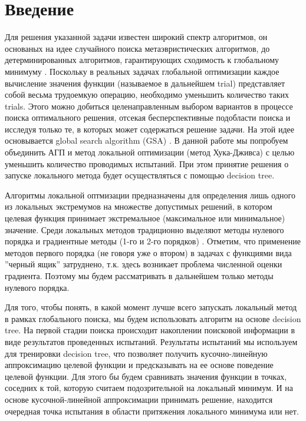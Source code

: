 \documentclass{svproc}
\begin{document}
\section{Введение}

Для решения указанной задачи известен широкий спектр алгоритмов, он основаных на идее случайного поиска \cite{fio_bib1, fio_bib2, fio_bib3} метаэвристических алгоритмов, до детерминированных алгоритмов, гарантирующих сходимость к глобальному минимуму \cite{fio_bib4, fio_bib5, fio_bib6}. 
Поскольку в реальных задачах глобальной оптимизации каждое вычисление значения функции (называемое в дальнейшем trial) представляет собой весьма трудоемкую операцию, необходимо уменьшить количество таких trials. Этого можно добиться целенаправленным выбором вариантов в процессе поиска оптимального решения, отсекая бесперспективные подобласти поиска и исследуя только те, в которых может содержаться решение задачи. На этой идее основывается global search algorithm (GSA) \cite{fio_bib7}. В данной работе мы попробуем объединить АГП и метод локальной оптимизации (метод Хука-Дживса) с целью уменьшить количество проводимых испытаний. При этом принятие решения о запуске локального метода будет осуществляться с помощью decision tree.

Алгоритмы локальной оптмизации предназначены для определения лишь одного из локальных экстремумов на множестве допустимых решений, в котором целевая функция принимает экстремальное (максимальное или минимальное) значение. 
Среди локальных методов традиционно выделяют методы нулевого порядка и градиентные методы  (1-го и 2-го порядков) \cite{fio_bib8,fio_bib9}.
Отметим, что применение методов первого порядка (не говоря уже о втором) в задачах с функциями вида ''черный ящик'' затруднено, т.к. здесь возникает проблема численной оценки градиента. Поэтому мы будем рассматривать в дальнейшем только методы нулевого порядка.

Для того, чтобы понять, в какой момент лучше всего запускать локальный метод в рамках глобального поиска, мы будем использовать алгоритм на основе decision tree.
На первой стадии поиска происходит накоплении поисковой информации в виде результатов проведенных испытаний.
Результаты испытаний мы используем для тренировки decision tree, что позволяет получить кусочно-линейную аппроксимацию целевой функции и  предсказывать на ее основе поведение целевой функции. Для этого бы будем сравнивать значения функции в точках, соседних к той, которую считаем подозрительной на локальный минимум. И на основе кусочной-линейной аппроксимации принимать решение, находится очередная точка испытания в области притяжения локального минимума или нет.
\end{document}
